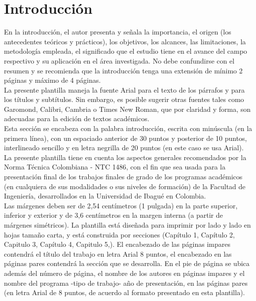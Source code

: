 \thispagestyle{fancyplain}
\chapter*{Introducción}


En la introducción, el autor presenta y señala la importancia, el origen (los antecedentes teóricos y prácticos), los objetivos, los alcances, las limitaciones, la metodología empleada, el significado que el estudio tiene en el avance del campo respectivo y su aplicación en el área investigada. No debe confundirse con el resumen y se recomienda que la introducción tenga una extensión de mínimo 2 páginas y máximo de 4 páginas.\\

La presente plantilla maneja la fuente Arial para el texto de los párrafos y para los títulos y subtítulos. Sin embargo, es posible sugerir otras fuentes tales como Garomond, Calibri, Cambria o Times New Roman, que por claridad y forma, son adecuadas para la edición de textos académicos.\\ 

Esta sección se encabeza con la palabra introducción, escrita con minúscula (en la primera línea), con un espaciado anterior de 30 puntos y posterior de 10 puntos, interlineado sencillo y en letra negrilla de 20 puntos (en este caso se usa Arial).\\

La presente plantilla tiene en cuenta los aspectos generales recomendados por la Norma Técnica Colombiana - NTC 1486, con el fin que sea usada para la presentación final de los trabajos finales de grado de los programas académicos (en cualquiera de sus modalidades o sus niveles de formación) de la Facultad de Ingeniería, desarrollados en la Universidad de Ibagué en Colombia.\\

Las márgenes deben ser de 2,54 centímetros (1 pulgada) en la parte superior, inferior y exterior y de 3,6 centímetros en la margen interna (a partir de márgenes simétricos). La plantilla está diseñada para imprimir por lado y lado en hojas tamaño carta, y está construida por secciones (Capítulo 1, Capítulo 2, Capitulo 3, Capítulo 4, Capitulo 5,). El encabezado de las páginas impares contendrá el título del trabajo en letra Arial 8 puntos, el encabezado en las páginas pares contendrá la sección que se desarrolla. En el pie de página se ubica además del número de página, el nombre de los autores en páginas impares y el nombre del programa -tipo de trabajo- año de presentación, en las páginas pares (en letra Arial de 8 puntos, de acuerdo al formato presentado en esta plantilla). \\

